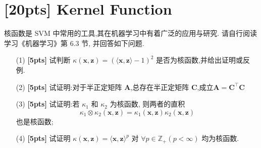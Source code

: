 \documentclass[a4paper,UTF8]{article}
\numberwithin{equation}{section}
\theoremstyle{definition}
\def \A {\mathbf{A}}
\def \C {\mathbf{C}}
\def \x {\mathbf{x}}
\def \z {\mathbf{z}}
\begin{document}
\section{[20pts] Kernel Function}
核函数是 SVM 中常用的工具,其在机器学习中有着广泛的应用与研究. 请自行阅读学习《机器学习》第 6.3 节, 并回答如下问题.
\begin{enumerate}
	\item[(1)] \textbf{[5pts]} 试判断 $\kappa(\x, \z) = \left(\langle\x, \z\rangle - 1\right)^2$ 是否为核函数,并给出证明或反例.
	\item[(2)] \textbf{[5pts]} 试证明:对于半正定矩阵 $\A$,总存在半正定矩阵 $\C$,成立$\A = \C^\top \C$
	\item[(3)] \textbf{[5pts]} 试证明:若 $\kappa_1$ 和 $\kappa_2$ 为核函数, 则两者的直积
	\[
	\kappa_1 \otimes \kappa_2(\x, \z)=\kappa_1(\x, \z) \kappa_2(\x, \z)
	\]
	也是核函数;
	\item[(4)] \textbf{[5pts]} 试证明 $\kappa(\x, \z) = \langle\x, \z\rangle^p$ 对 $\forall p\in\mathbb{Z}_+(p<\infty)$ 均为核函数.

	
\end{enumerate}
\end{document}
